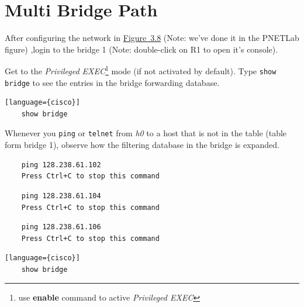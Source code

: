\documentclass{UTNetLab}
\begin{document}
\section{Multi Bridge Path}
    After configuring the network in \hyperref[fig:3.8]{Figure~3.8} (Note: we've done it in the PNETLab figure) ,login to the bridge 1 (Note: double-click on R1 to open it's console).

    Get to the \textit{Privileged EXEC}\footnote{use \textbf{enable} command to active \textit{Privileged EXEC}} mode (if not activated by default). Type \lstinline[language={cisco}]{show bridge} to see the entries in the bridge forwarding database.
    
    \begin{lstlisting}[frame=trBL][language={cisco}]
    show bridge
    \end{lstlisting}	

    Whenever you \lstinline{ping} or \lstinline{telnet} from \textit{h0} to a host that is not in the table (table form bridge 1), observe how the filtering database in the bridge is expanded.
        
    \begin{lstlisting}
    ping 128.238.61.102
    Press Ctrl+C to stop this command 
    \end{lstlisting}
    
    \begin{lstlisting}
    ping 128.238.61.104
    Press Ctrl+C to stop this command 
    \end{lstlisting} 
    
	\begin{lstlisting}
	ping 128.238.61.106
	Press Ctrl+C to stop this command
\end{lstlisting}


\begin{lstlisting}[frame=trBL][language={cisco}]
	show bridge
\end{lstlisting}
\end{document}
